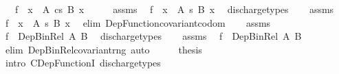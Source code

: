 \begin{isabellebody}
\ \ \ {\isachardoublequoteopen}f\ {\isacharcolon}{\kern0pt}\ {\isacharparenleft}{\kern0pt}x\ {\isacharcolon}{\kern0pt}\ A{\isacharparenright}{\kern0pt}\ {\isasymrightarrow}cs\ B{\isacharprime}{\kern0pt}\ x{\isachardoublequoteclose}\isanewline
%
\isadelimproof
%
\endisadelimproof
%
\isatagproof
{}\isamarkupfalse%
\ {\isacharminus}{\kern0pt}\isanewline
\ \ \isamarkupfalse%
\ assms\ \isamarkupfalse%
\ {\isachardoublequoteopen}f\ {\isacharcolon}{\kern0pt}\ {\isacharparenleft}{\kern0pt}x\ {\isacharcolon}{\kern0pt}\ A{\isacharparenright}{\kern0pt}\ {\isasymrightarrow}s\ B\ x{\isachardoublequoteclose}\ \isamarkupfalse%
\ discharge{\isacharunderscore}{\kern0pt}types\isanewline
\ \ \isamarkupfalse%
\ assms\ \isamarkupfalse%
\ {\isachardoublequoteopen}f\ {\isacharcolon}{\kern0pt}\ {\isacharparenleft}{\kern0pt}x\ {\isacharcolon}{\kern0pt}\ A{\isacharparenright}{\kern0pt}\ {\isasymrightarrow}s\ B{\isacharprime}{\kern0pt}\ x{\isachardoublequoteclose}\ \isamarkupfalse%
\ {\isacharparenleft}{\kern0pt}elim\ Dep{\isacharunderscore}{\kern0pt}Function{\isacharunderscore}{\kern0pt}covariant{\isacharunderscore}{\kern0pt}codom{\isacharparenright}{\kern0pt}\isanewline
\ \ \isamarkupfalse%
\ assms\ \isamarkupfalse%
\ {\isachardoublequoteopen}f\ {\isacharcolon}{\kern0pt}\ Dep{\isacharunderscore}{\kern0pt}Bin{\isacharunderscore}{\kern0pt}Rel\ A\ B{\isachardoublequoteclose}\ \isamarkupfalse%
\ discharge{\isacharunderscore}{\kern0pt}types\isanewline
\ \ \isamarkupfalse%
\ assms\ \isamarkupfalse%
\ {\isachardoublequoteopen}f\ {\isacharcolon}{\kern0pt}\ Dep{\isacharunderscore}{\kern0pt}Bin{\isacharunderscore}{\kern0pt}Rel\ A\ B{\isacharprime}{\kern0pt}{\isachardoublequoteclose}\isanewline
\ \ \ \ \isamarkupfalse%
\ {\isacharparenleft}{\kern0pt}elim\ Dep{\isacharunderscore}{\kern0pt}Bin{\isacharunderscore}{\kern0pt}Rel{\isacharunderscore}{\kern0pt}covariant{\isacharunderscore}{\kern0pt}rng{\isacharparenright}{\kern0pt}\ auto\isanewline
\ \ \isamarkupfalse%
\ \isamarkupfalse%
\ {\isacharquery}{\kern0pt}thesis\ \isamarkupfalse%
\ {\isacharparenleft}{\kern0pt}intro\ CDep{\isacharunderscore}{\kern0pt}FunctionI{\isacharparenright}{\kern0pt}\ discharge{\isacharunderscore}{\kern0pt}types\isanewline
{}\isamarkupfalse%
%
\endisatagproof
{\isafoldproof}%
%
\isadelimproof
\isanewline
%
\endisadelimproof
\isanewline

\end{isabellebody}
